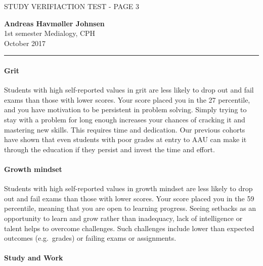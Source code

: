 \documentclass[]{article}
\let\oldparagraph\paragraph
\renewcommand{\paragraph}[1]{\oldparagraph{#1}\mbox{}}
\begin{document}
\pagebreak

STUDY VERIFIACTION TEST - PAGE 3

\textbf{Andreas Havmøller Johnsen}\\
1st semester Medialogy, CPH\\
October 2017

\begin{center}\rule{0.5\linewidth}{\linethickness}\end{center}

\paragraph{Grit}\label{grit}

Students with high self-reported values in grit are less likely to drop
out and fail exams than those with lower scores. Your score placed you
in the 27 percentile, and you have motivation to be persistent in
problem solving. Simply trying to stay with a problem for long enough
increases your chances of cracking it and mastering new skills. This
requires time and dedication. Our previous cohorts have shown that even
students with poor grades at entry to AAU can make it through the
education if they persist and invest the time and effort.

\paragraph{Growth mindset}\label{growth-mindset}

Students with high self-reported values in growth mindset are less
likely to drop out and fail exams than those with lower scores. Your
score placed you in the 59 percentile, meaning that you are open to
learning progress. Seeing setbacks as an opportunity to learn and grow
rather than inadequacy, lack of intelligence or talent helps to overcome
challenges. Such challenges include lower than expected outcomes
(e.g.~grades) or failing exams or assignments.

\paragraph{Study and Work}\label{study-and-work}
\end{document}
